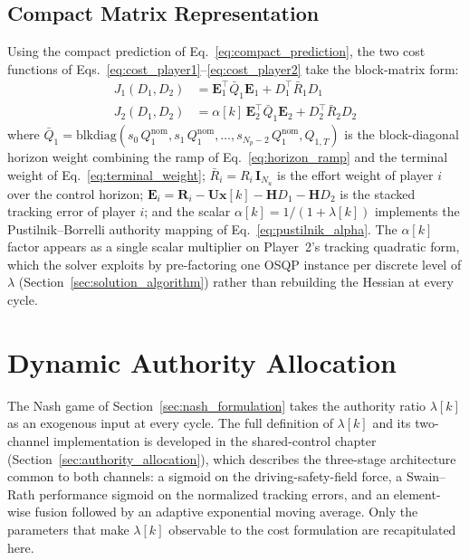 \documentclass[12pt,a4paper,oneside]{report}
\begin{document}
\subsection{Compact Matrix Representation}
\label{sec:cost_compact}

Using the compact prediction of Eq.~\eqref{eq:compact_prediction}, the two cost functions of Eqs.~\eqref{eq:cost_player1}--\eqref{eq:cost_player2} take the block-matrix form:
\begin{align}
J_1(D_1, D_2) &= \mathbf{E}_1^{\top} \bar{Q}_1 \mathbf{E}_1 + D_1^{\top} \bar{R}_1 D_1 \label{eq:cost_matrix_1}\\
J_2(D_1, D_2) &= \alpha[k] \, \mathbf{E}_2^{\top} \bar{Q}_1 \mathbf{E}_2 + D_2^{\top} \bar{R}_2 D_2 \label{eq:cost_matrix_2}
\end{align}
where $\bar{Q}_1 = \mathrm{blkdiag}\!\left( s_0 \, Q_1^{\text{nom}}, s_1 \, Q_1^{\text{nom}}, \ldots, s_{N_p - 2} \, Q_1^{\text{nom}}, Q_{1,T} \right)$ is the block-diagonal horizon weight combining the ramp of Eq.~\eqref{eq:horizon_ramp} and the terminal weight of Eq.~\eqref{eq:terminal_weight}; $\bar{R}_i = R_i \, \mathbf{I}_{N_u}$ is the effort weight of player $i$ over the control horizon; $\mathbf{E}_i = \mathbf{R}_i - \mathbf{U} \mathbf{x}[k] - \mathbf{H} D_1 - \mathbf{H} D_2$ is the stacked tracking error of player $i$; and the scalar $\alpha[k] = 1/(1 + \lambda[k])$ implements the Pustilnik--Borrelli authority mapping of Eq.~\eqref{eq:pustilnik_alpha}. The $\alpha[k]$ factor appears as a single scalar multiplier on Player~2's tracking quadratic form, which the solver exploits by pre-factoring one OSQP instance per discrete level of $\lambda$ (Section~\ref{sec:solution_algorithm}) rather than rebuilding the Hessian at every cycle.
\section{Dynamic Authority Allocation}
\label{sec:authority_allocation_}
The Nash game of Section~\ref{sec:nash_formulation} takes the authority ratio $\lambda[k]$ as an exogenous input at every cycle. The full definition of $\lambda[k]$ and its two-channel implementation is developed in the shared-control chapter (Section~\ref{sec:authority_allocation}), which describes the three-stage architecture common to both channels: a sigmoid on the driving-safety-field force, a Swain--Rath performance sigmoid on the normalized tracking errors, and an element-wise fusion followed by an adaptive exponential moving average. Only the parameters that make $\lambda[k]$ observable to the cost formulation are recapitulated here.
\end{document}
